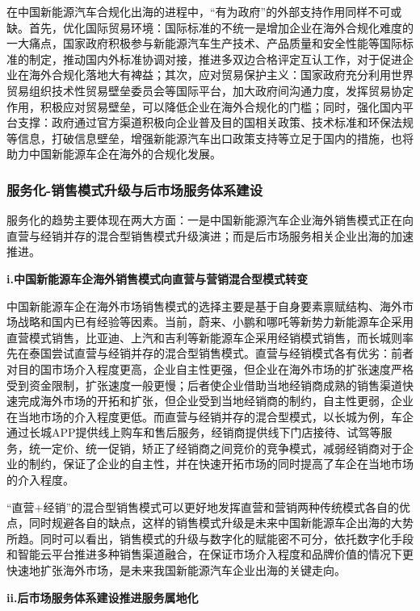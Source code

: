 \documentclass[a4paper, 10pt]{article}
\begin{document}
在中国新能源汽车合规化出海的进程中，“有为政府”的外部支持作用同样不可或缺。首先，优化国际贸易环境：国际标准的不统一是增加企业在海外合规化难度的一大痛点，国家政府积极参与新能源汽车生产技术、产品质量和安全性能等国际标准的制定，推动国内外标准协调对接，推进多双边合格评定互认工作，对于促进企业在海外合规化落地大有裨益；其次，应对贸易保护主义：国家政府充分利用世界贸易组织技术性贸易壁垒委员会等国际平台，加大政府间沟通力度，发挥贸易协定作用，积极应对贸易壁垒，可以降低企业在海外合规化的门槛；同时，强化国内平台支撑：政府通过官方渠道积极向企业普及目的国相关政策、技术标准和环保法规等信息，打破信息壁垒，增强新能源汽车出口政策支持等立足于国内的措施，也将助力中国新能源车企在海外的合规化发展。

  \subsubsection{服务化-销售模式升级与后市场服务体系建设}
  
服务化的趋势主要体现在两大方面：一是中国新能源汽车企业海外销售模式正在向直营与经销并存的混合型销售模式升级演进；而是后市场服务相关企业出海的加速推进。

\vspace{10pt}
\noindent \textbf{i.中国新能源车企海外销售模式向直营与营销混合型模式转变}

中国新能源车企在海外市场销售模式的选择主要是基于自身要素禀赋结构、海外市场战略和国内已有经验等因素。当前，蔚来、小鹏和哪吒等新势力新能源车企采用直营模式销售，比亚迪、上汽和吉利等新能源车企采用经销模式销售，而长城则率先在泰国尝试直营与经销并存的混合型销售模式。直营与经销模式各有优劣：前者对目的国市场介入程度更高，企业自主性更强，但企业在海外市场的扩张速度严格受到资金限制，扩张速度一般更慢；后者使企业借助当地经销商成熟的销售渠道快速完成海外市场的开拓和扩张，但企业受到当地经销商的制约，自主性更弱，企业在当地市场的介入程度更低。而直营与经销并存的混合型模式，以长城为例，车企通过长城APP提供线上购车和售后服务，经销商提供线下门店接待、试驾等服务，统一定价、统一促销，矫正了经销商之间竞价的竞争模式，减弱经销商对于企业的制约，保证了企业的自主性，并在快速开拓市场的同时提高了车企在当地市场的介入程度。

“直营+经销”的混合型销售模式可以更好地发挥直营和营销两种传统模式各自的优点，同时规避各自的缺点，这样的销售模式升级是未来中国新能源车企出海的大势所趋。同时可以看出，销售模式的升级与数字化的赋能密不可分，依托数字化手段和智能云平台推进多种销售渠道融合，在保证市场介入程度和品牌价值的情况下更快速地扩张海外市场，是未来我国新能源汽车企业出海的关键走向。

\vspace{10pt}
\noindent \textbf{ii.后市场服务体系建设推进服务属地化}
\end{document}

